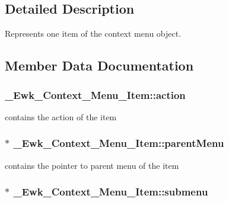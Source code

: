 \subsection{Detailed Description}
Represents one item of the context menu object. 

\subsection{Member Data Documentation}
\hypertarget{struct__Ewk__Context__Menu__Item_af2d6b9c07e8639a1e9e13d7a80bfebd3}{
\subsubsection[{action}]{ \+\_\+\+Ewk\+\_\+\+Context\+\_\+\+Menu\+\_\+\+Item\+::action}}\label{struct__Ewk__Context__Menu__Item_af2d6b9c07e8639a1e9e13d7a80bfebd3}
contains the action of the item \hypertarget{struct__Ewk__Context__Menu__Item_a5f9759411cbaef982f55170b13a276a1}{
\subsubsection[{parent\+Menu}]{$\ast$ \+\_\+\+Ewk\+\_\+\+Context\+\_\+\+Menu\+\_\+\+Item\+::parent\+Menu}}\label{struct__Ewk__Context__Menu__Item_a5f9759411cbaef982f55170b13a276a1}
contains the pointer to parent menu of the item \hypertarget{struct__Ewk__Context__Menu__Item_afc1cb2c48001028d2ac39904a822ec8e}{
\subsubsection[{submenu}]{$\ast$ \+\_\+\+Ewk\+\_\+\+Context\+\_\+\+Menu\+\_\+\+Item\+::submenu}}\label{struct__Ewk__Context__Menu__Item_afc1cb2c48001028d2ac39904a822ec8e}
